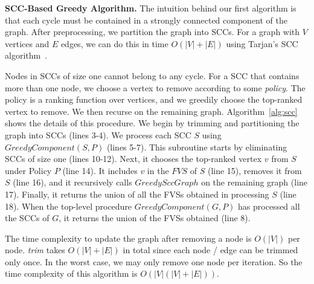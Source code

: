 \begin{algorithm}[t]
\SetAlgoLined\DontPrintSemicolon
{}
\caption{Sort-based greedy algorithm}
\label{alg:sort}
\end{algorithm}




{\bf SCC-Based Greedy Algorithm.} The intuition behind our first algorithm is that each cycle must be contained in a strongly connected component of the graph. After preprocessing, we partition the graph into SCCs. For a graph with $V$ vertices and $E$ edges, we can do this in time $O(|V|+|E|)$ using Tarjan's SCC algorithm~\cite{tarjan1972depth}.

Nodes in SCCs of size one cannot belong to any cycle. For a SCC that contains
more than one node, we choose a vertex to remove according to some \emph{policy}. The policy is a ranking function over vertices, and we greedily choose the top-ranked vertex to remove. We then recurse on the remaining graph. Algorithm~\ref{alg:scc} shows the details of this procedure. We begin by trimming and partitioning the graph into SCCs  (lines 3-4). We process each SCC $S$ using $GreedyComponent(S, P)$ (lines 5-7). This subroutine starts by eliminating SCCs of size one (lines 10-12). Next, it chooses the top-ranked vertex $v$ from $S$ under Policy $P$ (line 14). It includes $v$ in the $FVS$ of $S$ (line 15), removes it from $S$ (line 16), and it recursively calls $GreedySccGraph$ on the remaining graph (line 17). Finally, it returns the union of all the FVSs obtained in processing $S$ (line 18). When the top-level procedure $GreedyComponent(G, P)$ has processed all the SCCs of $G$, it returns the union of the FVSs obtained (line 8).

The time complexity to update the graph after removing a node is $O(|V|)$ per
node. \emph{trim} takes $O(|V| + |E|)$ in total since each node / edge can be trimmed only once. In the worst case, we may only remove one node per iteration. So the time complexity of this algorithm is $O(|V|(|V|+|E|))$.

